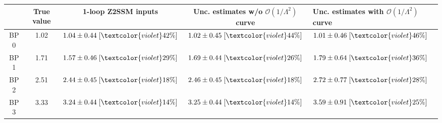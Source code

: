 \begin{tabular}{c||c|c|c}
 & True value & 1-loop Z2SSM inputs & Unc. estimates w/o $\mathcal{O}(1/\Lambda^2)$ curve & Unc. estimates with $\mathcal{O}(1/\Lambda^2)$ curve\\
\hline\hline
BP 0 & 1.02 & $1.04\pm0.44\;[\textcolor{violet}{42\%}]$ & $1.02\pm0.45\;[\textcolor{violet}{44\%}]$ & $1.01\pm0.46\;[\textcolor{violet}{46\%}]$\\\hline
BP 1 & 1.71 & $1.57\pm0.46\;[\textcolor{violet}{29\%}]$ & $1.69\pm0.44\;[\textcolor{violet}{26\%}]$ & $1.79\pm0.64\;[\textcolor{violet}{36\%}]$\\\hline
BP 2 & 2.51 & $2.44\pm0.45\;[\textcolor{violet}{18\%}]$ & $2.46\pm0.45\;[\textcolor{violet}{18\%}]$ & $2.72\pm0.77\;[\textcolor{violet}{28\%}]$\\\hline
BP 3 & 3.33 & $3.24\pm0.44\;[\textcolor{violet}{14\%}]$ & $3.25\pm0.44\;[\textcolor{violet}{14\%}]$ & $3.59\pm0.91\;[\textcolor{violet}{25\%}]$\\
\end{tabular}
